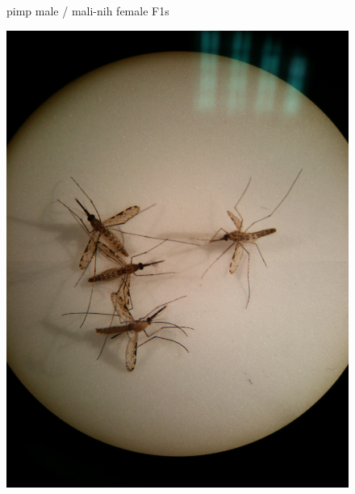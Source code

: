 \documentclass{article}
\begin{document}
\begin{figure}[p]

pimp male / mali-nih female F1s

\includegraphics[scale=0.05]{pimp-♂_mali-NIH-♀}
\end{figure}

{}


\end{document}
